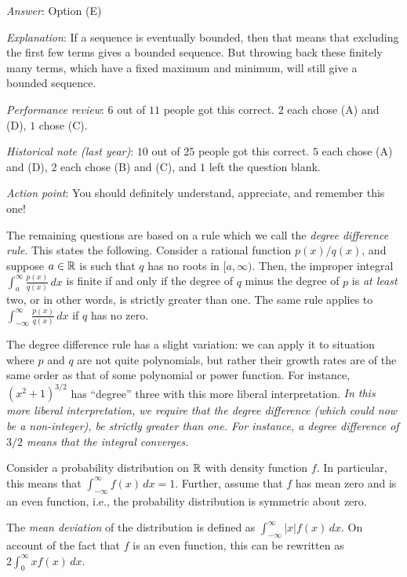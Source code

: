 \documentclass[10pt]{amsart}
\begin{document}
\begin{enumerate}
  {\em Answer}: Option (E)

  {\em Explanation}: If a sequence is eventually bounded, then that
  means that excluding the first few terms gives a bounded
  sequence. But throwing back these finitely many terms, which have a
  fixed maximum and minimum, will still give a bounded sequence.

  {\em Performance review}: $6$ out of $11$ people got this
  correct. $2$ each chose (A) and (D), $1$ chose (C).

  {\em Historical note (last year)}: $10$ out of $25$ people got this
  correct. $5$ each chose (A) and (D), $2$ each chose (B) and (C), and
  $1$ left the question blank.

  {\em Action point}: You should definitely understand, appreciate,
  and remember this one!

  The remaining questions are based on a rule which we call the {\em
  degree difference rule}. This states the following. Consider a
  rational function $p(x)/q(x)$, and suppose $a \in \mathbb{R}$ is such that
  $q$ has no roots in $[a,\infty)$. Then, the improper integral
  $\int_a^\infty \frac{p(x)}{q(x)} \, dx$ is finite if and only if the
  degree of $q$ minus the degree of $p$ is {\em at least} two, or in
  other words, is strictly greater than one. The same rule applies to
  $\int_{-\infty}^\infty \frac{p(x)}{q(x)} \, dx$ if $q$ has no zero.

  The degree difference rule has a slight variation: we can apply it
  to situation where $p$ and $q$ are not quite polynomials, but rather
  their growth rates are of the same order as that of some polynomial
  or power function. For instance, $(x^2 + 1)^{3/2}$ has ``degree''
  three with this more liberal interpretation. {\em In this more
  liberal interpretation, we require that the degree difference (which
  could now be a non-integer), be strictly greater than one. For
  instance, a degree difference of $3/2$ means that the integral
  converges.}

  Consider a probability distribution on $\mathbb{R}$ with density function
  $f$. In particular, this means that $\int_{-\infty}^\infty f(x) \,
  dx = 1$. Further, assume that $f$ has mean zero and is an even
  function, i.e., the probability distribution is symmetric about
  zero.

  The {\em mean deviation} of the distribution is defined as
  $\int_{-\infty}^\infty |x|f(x) \, dx$. On account of the fact that
  $f$ is an even function, this can be rewritten as $2
  \int_0^\infty xf(x) \, dx$.


\end{enumerate}
\end{document}
